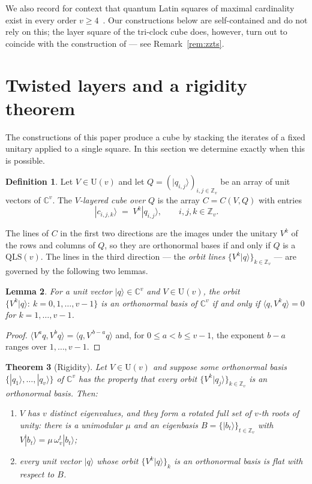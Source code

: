 \documentclass[11pt]{amsart}
\newtheorem{theorem}{Theorem}[section]
\newtheorem{lemma}[theorem]{Lemma}
\theoremstyle{definition}
\newtheorem{definition}[theorem]{Definition}
\newcommand{\C}{\mathbb{C}}
\newcommand{\Z}{\mathbb{Z}}
\newcommand{\ket}[1]{|#1\rangle}
\newcommand{\ip}[2]{\langle #1,#2\rangle}
\newcommand{\QLS}{\mathrm{QLS}}
\begin{document}
We also record for context that quantum Latin squares of maximal
cardinality exist in every order $v\ge4$~\cite{ZZTS2025}.  Our
constructions below are self-contained and do not rely on this; the layer
square of the tri-clock cube does, however, turn out to coincide with the
construction of \cite[Thm.~3.1]{ZZTS2025} --- see Remark~\ref{rem:zzts}.

\section{Twisted layers and a rigidity theorem}\label{sec:layers}

The constructions of this paper produce a cube by stacking the iterates of
a fixed unitary applied to a single square.  In this section we determine
exactly when this is possible.

\begin{definition}
Let $V\in\mathrm U(v)$ and let $Q=(\ket{q_{i,j}})_{i,j\in\Z_v}$ be an array
of unit vectors of $\C^v$.  The \emph{$V$-layered cube over $Q$} is the
array $C=C(V,Q)$ with entries
\[
\ket{c_{i,j,k}}\;=\;V^{k}\ket{q_{i,j}},\qquad i,j,k\in\Z_v .
\]
\end{definition}

The lines of $C$ in the first two directions are the images under the
unitary $V^k$ of the rows and columns of $Q$, so they are orthonormal bases
if and only if $Q$ is a $\QLS(v)$.  The lines in the third direction --- the
\emph{orbit lines} $\{V^k\ket q\}_{k\in\Z_v}$ --- are governed by the
following two lemmas.

\begin{lemma}\label{lem:orbit}
For a unit vector $\ket q\in\C^v$ and $V\in\mathrm U(v)$, the orbit
$\{V^k\ket q:\ k=0,1,\dots,v-1\}$ is an orthonormal basis of $\C^v$ if and
only if $\ip{q}{V^k q}=0$ for $k=1,\dots,v-1$.
\end{lemma}

\begin{proof}
$\ip{V^aq}{V^bq}=\ip{q}{V^{\,b-a}q}$ and, for $0\le a<b\le v-1$, the
exponent $b-a$ ranges over $1,\dots,v-1$.
\end{proof}

\begin{theorem}[Rigidity]\label{thm:rigidity}
Let $V\in\mathrm U(v)$ and suppose some orthonormal basis
$\{\ket{q_1},\dots,\ket{q_v}\}$ of $\C^v$ has the property that every orbit
$\{V^k\ket{q_j}\}_{k\in\Z_v}$ is an orthonormal basis.  Then:
\begin{enumerate}
\item[\textup{(i)}] $V$ has $v$ distinct eigenvalues, and they form a
rotated full set of $v$-th roots of unity: there is a unimodular $\mu$ and
an eigenbasis $B=\{\ket{b_t}\}_{t\in\Z_v}$ with
$V\ket{b_t}=\mu\,\omega_v^{t}\ket{b_t}$;
\item[\textup{(ii)}] \emph{every} unit vector $\ket q$ whose orbit
$\{V^k\ket q\}_k$ is an orthonormal basis is flat with respect to $B$.
\end{enumerate}
\end{theorem}
\end{document}
